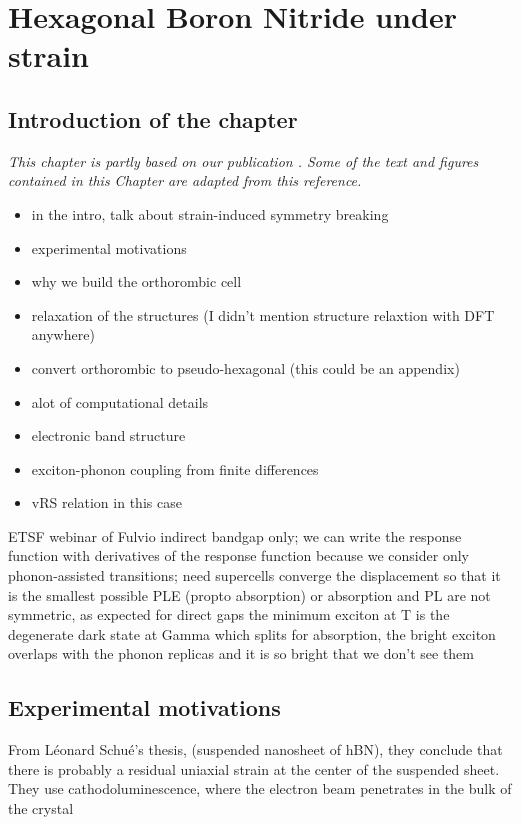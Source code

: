 \chapter{Hexagonal Boron Nitride under strain}
\chaptertoc{}

\section{Introduction of the chapter}
\textit{This chapter is partly based on our publication \cite{lechifflart2022excitons}. Some of the text and figures contained in this Chapter are adapted from this reference. }
\begin{itemize}
	\item in the intro, talk about strain-induced symmetry breaking
	\item experimental motivations
	\item why we build the orthorombic cell 
	\item relaxation of the structures (I didn't mention structure relaxtion with DFT anywhere)
	\item convert orthorombic to pseudo-hexagonal (this could be an appendix)
	\item alot of computational details
	\item electronic band structure 
	\item exciton-phonon coupling from finite differences
	\item vRS relation in this case 
\end{itemize}
%
%
ETSF webinar of Fulvio
indirect bandgap only; we can write the response function with derivatives of the response function because we consider only phonon-assisted transitions; need supercells
converge the displacement so that it is the smallest possible
PLE (propto absorption) or absorption and PL are not symmetric, as expected for direct gaps
the minimum exciton at T is the degenerate dark state at Gamma which splits
for absorption, the bright exciton overlaps with the phonon replicas and it is so bright that we don't see them 

%
\section{Experimental motivations}
From Léonard Schué's thesis, (suspended nanosheet of hBN), they conclude that there is probably a residual uniaxial strain at the center of the suspended sheet. They use cathodoluminescence, where the electron beam penetrates in the bulk of the crystal

